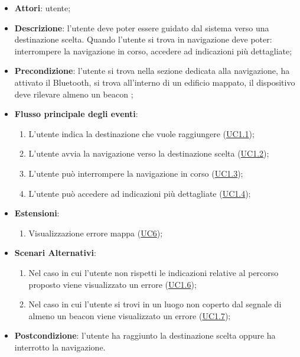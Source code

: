 \documentclass[../AnalisiDeiRequisiti.tex]{subfiles}
\begin{document}
\begin{itemize}
\item \textbf{Attori}: utente;
\item \textbf{Descrizione}: l'utente deve poter essere guidato dal sistema verso una destinazione scelta. Quando l'utente si trova in navigazione deve poter: interrompere la navigazione in corso, accedere ad indicazioni più dettagliate; 
      \item \textbf{Precondizione}: l'utente si trova nella sezione dedicata alla navigazione, ha attivato il Bluetooth, si trova all'interno di un edificio mappato, il dispositivo deve rilevare almeno un beacon
;

        \item \textbf{Flusso principale degli eventi}:
          \begin{enumerate}
          \item L'utente indica la destinazione che vuole raggiungere (\hyperlink{UC1.1}{UC1.1});
          \item L'utente avvia la navigazione verso la destinazione scelta (\hyperlink{UC1.2}{UC1.2});
          \item L'utente può interrompere la navigazione in corso  (\hyperlink{UC1.3}{UC1.3});
          \item L'utente può accedere ad indicazioni più dettagliate  (\hyperlink{UC1.4}{UC1.4});

      \end{enumerate}
    \item \textbf{Estensioni}:
      \begin{enumerate}
          \item Visualizzazione errore mappa (\hyperlink{UC6}{UC6});

      \end{enumerate}
    \item \textbf{Scenari Alternativi}:
      \begin{enumerate}
          \item Nel caso in cui l'utente non rispetti le indicazioni relative al percorso proposto viene visualizzato un errore (\hyperlink{UC1.6}{UC1.6});
          \item Nel caso in cui l'utente si trovi in un luogo non coperto dal segnale di almeno un beacon viene visualizzato un errore (\hyperlink{UC1.7}{UC1.7});

      \end{enumerate}
    \item \textbf{Postcondizione}: l'utente ha raggiunto la destinazione scelta oppure ha interrotto la navigazione.
  \end{itemize}
\hypertarget{UC1.1}{}
\end{document}
